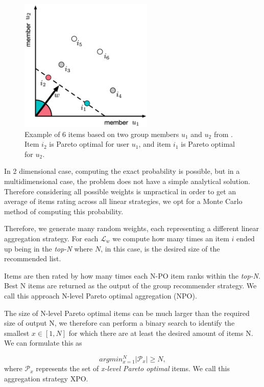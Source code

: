 \begin{figure}[htbp]
    \centering
    \includegraphics[width=2.5in]{img/XPO_las.png}
    \caption[Example of 6 items based on two group members $u_1$ and $u_2$ from \cite{sacharidis_2019_top_n_with_fairness}.]{Example of 6 items based on two group members $u_1$ and $u_2$ from \cite{sacharidis_2019_top_n_with_fairness}. Item $i_2$ is Pareto optimal for user $u_1$, and item $i_1$ is Pareto optimal for $u_2$.}
    \label{fig:xpo_example}
\end{figure}


In 2 dimensional case, computing the exact probability is possible, but in a multidimensional case, the problem does not have a simple analytical solution. Therefore considering all possible weights is unpractical in order to get an average of items rating across all linear strategies, we opt for a Monte Carlo method of computing this probability.

Therefore, we generate many random weights, each representing a different linear aggregation strategy. For each $\mathcal{L}_w$ we compute how many times an item $i$ ended up being in the \textit{top-N} where  $N$, in this case, is the desired size of the recommended list.

Items are then rated by how many times each N-PO item ranks within the \textit{top-N}. Best N items are returned as the output of the group recommender strategy. We call this approach N-level Pareto optimal aggregation (NPO).

The size of N-level Pareto optimal items can be much larger than the required size of output N, we therefore can perform a binary search to identify the smallest $x \in [1, N]$ for which there are at least the desired amount of items N. We can formulate this as 

\begin{equation} \label{eq:xpo}
    argmin_{x=1}^{N} |\mathcal{P}_x| \geq N,
\end{equation}
where $\mathcal{P}_x$ represents the set of \textit{x-level Pareto optimal} items. We call this aggregation strategy XPO.

